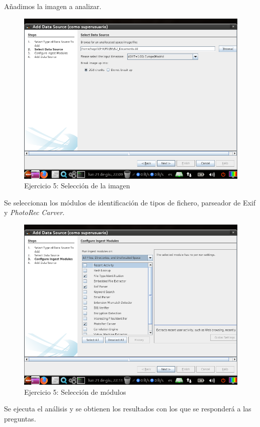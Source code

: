 \documentclass[11pt]{article}
\begin{document}
Añadimos la imagen a analizar.

\begin{figure}[H]
  \caption{Ejercicio 5: Selección de la imagen}
  \centering
  \includegraphics[scale=0.7]{e5-3.png}
\end{figure}

Se seleccionan los módulos de identificación de tipos de fichero, parseador de Exif y \textit{PhotoRec Carver}.

\begin{figure}[H]
  \caption{Ejercicio 5: Selección de módulos}
  \centering
  \includegraphics[scale=0.7]{e5-4.png}
\end{figure}

Se ejecuta el análisis y se obtienen los resultados con los que se responderá a las preguntas.
\end{document}
